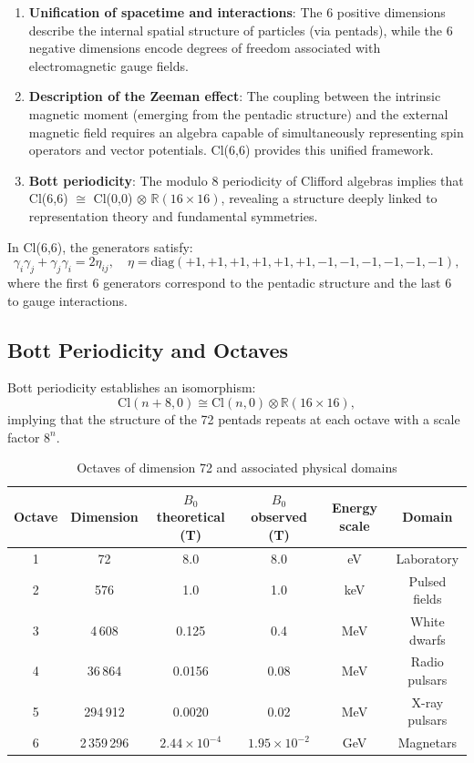 \documentclass[11pt,a4paper]{article}
\theoremstyle{plain}
\theoremstyle{definition}
\theoremstyle{remark}
\begin{document}
\begin{enumerate}
  \item \textbf{Unification of spacetime and interactions}: The 6 positive dimensions describe the internal spatial structure of particles (via pentads), while the 6 negative dimensions encode degrees of freedom associated with electromagnetic gauge fields.
  
  \item \textbf{Description of the Zeeman effect}: The coupling between the intrinsic magnetic moment (emerging from the pentadic structure) and the external magnetic field requires an algebra capable of simultaneously representing spin operators and vector potentials. Cl(6,6) provides this unified framework.
  
  \item \textbf{Bott periodicity}: The modulo 8 periodicity of Clifford algebras implies that Cl(6,6) $\cong$ Cl(0,0) $\otimes$ $\mathbb{R}(16\times 16)$, revealing a structure deeply linked to representation theory and fundamental symmetries.
\end{enumerate}

In Cl(6,6), the generators satisfy:
\begin{equation}
  \gamma_i \gamma_j + \gamma_j \gamma_i = 2\eta_{ij}, \quad \eta = \mathrm{diag}(+1,+1,+1,+1,+1,+1,-1,-1,-1,-1,-1,-1),
\end{equation}
where the first 6 generators correspond to the pentadic structure and the last 6 to gauge interactions.

\subsection{Bott Periodicity and Octaves}

Bott periodicity \cite{bott1959stable} establishes an isomorphism:
\begin{equation}
  \mathrm{Cl}(n+8,0) \cong \mathrm{Cl}(n,0) \otimes \mathbb{R}(16\times 16),
\end{equation}
implying that the structure of the 72 pentads repeats at each octave with a scale factor $8^n$.

\begin{table}[H]
\centering
\caption{Octaves of dimension 72 and associated physical domains}
\label{tab:octaves}
\begin{tabular}{cccccc}
\toprule
Octave & Dimension & $B_0$ theoretical (T) & $B_0$ observed (T) & Energy scale & Domain \\
\midrule
1 & 72 & 8.0 & 8.0 & eV & Laboratory \\
2 & 576 & 1.0 & 1.0 & keV & Pulsed fields \\
3 & 4\,608 & 0.125 & 0.4 & MeV & White dwarfs \\
4 & 36\,864 & 0.0156 & 0.08 & MeV & Radio pulsars \\
5 & 294\,912 & 0.0020 & 0.02 & MeV & X-ray pulsars \\
6 & 2\,359\,296 & $2.44\times10^{-4}$ & $1.95\times10^{-2}$ & GeV & Magnetars \\
\bottomrule
\end{tabular}
\end{table}
\end{document}
